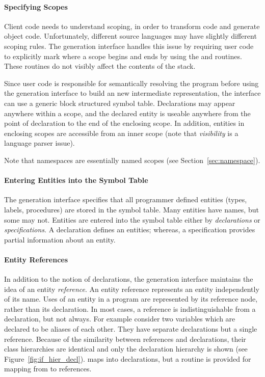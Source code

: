 \paragraph{Specifying Scopes}
Client code needs to understand scoping, in order to transform code
and generate object code.  Unfortunately, different source languages
may have slightly different scoping rules.  The generation interface
handles this issue by requiring user code to explicitly mark where a
scope begins and ends by using the  and
 routines.  These routines do not visibly affect
the contents of the stack.  

Since user code is responsible for semantically resolving the program
before using the generation interface to build an new intermediate
representation, the interface can use a generic block structured
symbol table.  Declarations may appear anywhere within a scope, and
the declared entity is useable anywhere from the point of declaration
to the end of the enclosing scope.  In addition, entities in enclosing
scopes are accessible from an inner scope (note that \emph{visibility}
is a language parser issue).

Note that namespaces are essentially named scopes (see
Section~\ref{sec:namespace}).

\paragraph{Entering Entities into the Symbol Table}
The generation interface specifies that all programmer defined
entities (\eg types, labels, procedures) are stored in the symbol
table.  Many entities have names, but some may not.  Entities are
entered into the symbol table either by \emph{declarations} or
\emph{specifications}.  A declaration defines an entities; whereas, a
specification provides partial information about an entity.

\paragraph{Entity References}
In addition to the notion of declarations, the generation interface
maintains the idea of an entity \emph{reference}.  An entity reference
represents an entity independently of its name.  Uses of an entity in
a program are represented by its reference node, rather than its
declaration.  In most cases, a reference is indistinguishable from a
declaration, but not always.  For example consider two variables which
are declared to be aliases of each other.  They have separate
declarations but a single reference.  Because of the similarity
between references and declarations, their class hierarchies are
identical and only the declaration hierarchy is shown (see
Figure~\ref{fig:if_hier_decl}).   maps into declarations,
but a routine is provided for mapping from  to references.

